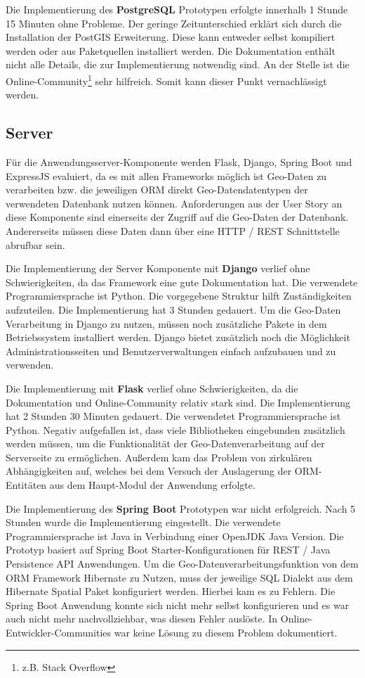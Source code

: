Die Implementierung des \textbf{PostgreSQL} Prototypen erfolgte innerhalb 1 Stunde 15 Minuten ohne Probleme.
Der geringe Zeitunterschied erklärt sich durch die Installation der PostGIS Erweiterung.
Diese kann entweder selbst kompiliert werden oder aus Paketquellen installiert werden.
Die Dokumentation enthält nicht alle Details, die zur Implementierung notwendig sind.
An der Stelle ist die Online-Community\footnote{z.B. Stack Overflow} sehr hilfreich.
Somit kann dieser Punkt vernachlässigt werden.

\subsection{Server}
Für die Anwendungsserver-Komponente werden Flask, Django, Spring Boot und ExpressJS evaluiert, da es mit allen Frameworks möglich ist Geo-Daten zu verarbeiten bzw. die jeweiligen \ac{ORM} direkt Geo-Datendatentypen der verwendeten Datenbank nutzen können.
Anforderungen aus der User Story an diese Komponente sind einerseits der Zugriff auf die Geo-Daten der Datenbank. Andererseits müssen diese Daten dann über eine HTTP / REST Schnittstelle abrufbar sein.

Die Implementierung der Server Komponente mit \textbf{Django} verlief ohne Schwierigkeiten, da das Framework eine gute Dokumentation hat.
Die verwendete Programmiersprache ist Python.
Die vorgegebene Struktur hilft Zuständigkeiten aufzuteilen.
Die Implementierung hat 3 Stunden gedauert.
Um die Geo-Daten Verarbeitung in Django zu nutzen, müssen noch zusätzliche Pakete in dem Betriebssystem installiert werden.
Django bietet zusätzlich noch die Möglichkeit Administrationsseiten und Benutzerverwaltungen einfach aufzubauen und zu verwenden.

Die Implementierung mit \textbf{Flask} verlief ohne Schwierigkeiten, da die Dokumentation und Online-Community relativ stark sind.
Die Implementierung hat 2 Stunden 30 Minuten gedauert.
Die verwendetet Programmiersprache ist Python.
Negativ aufgefallen ist, dass viele Bibliotheken eingebunden zusätzlich werden müssen, um die Funktionalität der Geo-Datenverarbeitung auf der Serverseite zu ermöglichen.
Außerdem kam das Problem von zirkulären Abhängigkeiten auf, welches bei dem Versuch der Auslagerung der \ac{ORM}-Entitäten aus dem Haupt-Modul der Anwendung erfolgte.

Die Implementierung des \textbf{Spring Boot} Prototypen war nicht erfolgreich.
Nach 5 Stunden wurde die Implementierung eingestellt.
Die verwendete Programmiersprache ist Java in Verbindung einer OpenJDK Java Version.
Die Prototyp basiert auf Spring Boot Starter-Konfigurationen für REST / Java Persistence API Anwendungen.
Um die Geo-Datenverarbeitungsfunktion von dem \ac{ORM} Framework Hibernate zu Nutzen, muss der jeweilige SQL Dialekt aus dem Hibernate Spatial Paket konfiguriert werden.
Hierbei kam es zu Fehlern.
Die Spring Boot Anwendung konnte sich nicht mehr selbst konfigurieren und es war auch nicht mehr nachvollziehbar, was diesen Fehler auslöste.
In Online-Entwickler-Communities war keine Lösung zu diesem Problem dokumentiert.


